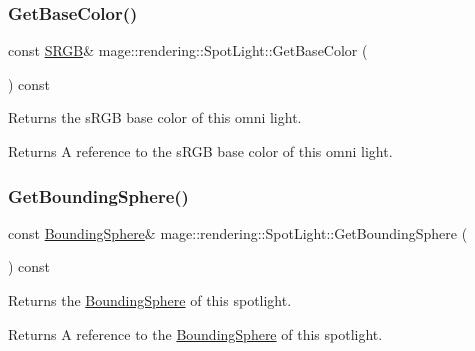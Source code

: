 \subsubsection{\texorpdfstring{Get\+Base\+Color()}{GetBaseColor()}\hspace{0.1cm}{\footnotesize\ttfamily [2/2]}}
{\footnotesize\ttfamily const \hyperlink{structmage_1_1_s_r_g_b}{S\+R\+GB}\& mage\+::rendering\+::\+Spot\+Light\+::\+Get\+Base\+Color (\begin{DoxyParamCaption}{ }\end{DoxyParamCaption}) const\hspace{0.3cm}{\ttfamily [noexcept]}}

Returns the s\+R\+GB base color of this omni light.

\begin{DoxyReturn}{Returns}
A reference to the s\+R\+GB base color of this omni light. 
\end{DoxyReturn}
\hypertarget{classmage_1_1rendering_1_1_spot_light_a003e42ab1d3059ae5750893bcaa8e0b3}{}\label{classmage_1_1rendering_1_1_spot_light_a003e42ab1d3059ae5750893bcaa8e0b3} 
\subsubsection{\texorpdfstring{Get\+Bounding\+Sphere()}{GetBoundingSphere()}}
{\footnotesize\ttfamily const \hyperlink{classmage_1_1_bounding_sphere}{Bounding\+Sphere}\& mage\+::rendering\+::\+Spot\+Light\+::\+Get\+Bounding\+Sphere (\begin{DoxyParamCaption}{ }\end{DoxyParamCaption}) const\hspace{0.3cm}{\ttfamily [noexcept]}}

Returns the \hyperlink{classmage_1_1_bounding_sphere}{Bounding\+Sphere} of this spotlight.

\begin{DoxyReturn}{Returns}
A reference to the \hyperlink{classmage_1_1_bounding_sphere}{Bounding\+Sphere} of this spotlight. 
\end{DoxyReturn}
\hypertarget{classmage_1_1rendering_1_1_spot_light_aab94a7a9d5434d8e7913d7b52379841b}{}\label{classmage_1_1rendering_1_1_spot_light_aab94a7a9d5434d8e7913d7b52379841b} 
